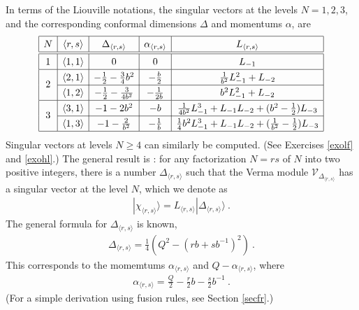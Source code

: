 \documentclass[12pt, a4paper, notitlepage, twoside]{report}
\numberwithin{equation}{section}
\theoremstyle{break}
\begin{document}
In terms of the Liouville notations, the singular vectors at the levels $N=1,2,3$, and the corresponding conformal dimensions $\Delta$ and momentums $\alpha$, are 
\begin{align}
\renewcommand{\arraystretch}{1.3}
\begin{array}{|c|c|c|c|c|}
\hline 
N & \langle r,s\rangle & \Delta_{\langle r,s\rangle} & \alpha_{\langle r,s\rangle} & L_{\langle r,s\rangle} 
\\
\hline\hline
1 & \langle 1,1\rangle & 0 & 0 & L_{-1}
\\
\hline
\multirow{2}{*}{2} & 
\langle 2,1\rangle & -\frac12 -\frac{3}{4} b^2 & -\frac{b}{2} & \frac{1}{b^2}L_{-1}^2 + L_{-2}
\\
\cline{2-5}
& \langle 1,2\rangle & -\frac12 - \frac{3}{4b^2} &  -\frac{1}{2b} & b^2L_{-1}^2 + L_{-2} 
\\
\hline
\multirow{2}{*}{3} &
\langle 3,1 \rangle &  -1 -2 b^2 & -b & \frac{1}{4b^2}L_{-1}^3 + L_{-1}L_{-2}+(b^2-\frac12)L_{-3}
\\
\cline{2-5}
& \langle 1,3 \rangle &  -1 - \frac{2}{b^2} &  -\frac{1}{b} & \frac14 b^2L_{-1}^3 + L_{-1}L_{-2} + (\frac{1}{b^2}-\frac12)L_{-3}
\\
\hline
\end{array}
\label{lot}
\end{align}
Singular vectors at levels $N\geq 4$ can similarly be computed. (See Exercises \ref{exolf} and \ref{exohl}.) The general result is \cite{fms97}: for any factorization $N=rs$ of $N$ into two positive integers, there is a number $\Delta_{\langle r,s \rangle}$ such that the Verma module $\mathcal{V}_{\Delta_{\langle r,s \rangle}}$ has a singular vector at the level $N$, which we denote as
\begin{align}
 |\chi_{\langle r,s \rangle}\rangle = L_{\langle r,s \rangle} |\Delta_{\langle r,s \rangle}\rangle\ .
\label{lrs}
\end{align}
The general formula for $\Delta_{\langle r,s \rangle}$ is known, 
\begin{align}
 \Delta_{\langle r,s \rangle} = \frac14\left(Q^2-(rb+sb^{-1})^2\right)\ .
\label{drs}
\end{align}
This corresponds to the momemtums $\alpha_{\langle r,s \rangle}$ and $Q-\alpha_{\langle r,s \rangle}$, where
\begin{align}
 \boxed{\alpha_{\langle r,s \rangle} = \frac{Q}{2} -\frac{r}{2}b - \frac{s}{2}b^{-1} }\ . 
\label{ars}
\end{align}
(For a simple derivation using fusion rules, see Section \ref{secfr}.)
\end{document}
